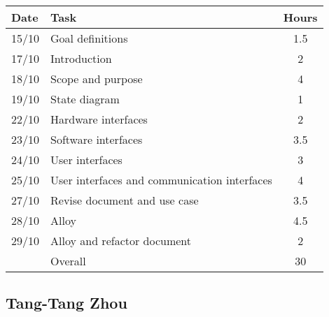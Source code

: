 \begin{table}[H]
\begin{tabularx}{\textwidth}{|l|X|c|}
\hline
\rowcolor[HTML]{C0C0C0} 
Date & Task & Hours\\ \hline
15/10 & Goal definitions & 1.5\\ \hline
17/10 & Introduction & 2\\ \hline
18/10 & Scope and purpose & 4\\ \hline
19/10 & State diagram & 1\\ \hline
22/10 & Hardware interfaces & 2\\ \hline 
23/10 & Software interfaces & 3.5\\ \hline
24/10 & User interfaces & 3\\ \hline
25/10 & User interfaces and communication interfaces & 4\\ \hline 
27/10 & Revise document and use case & 3.5\\ \hline
28/10 & Alloy & 4.5\\ \hline
29/10 & Alloy and refactor document & 2\\ \hline
\rowcolor[HTML]{C0C0C0} 
& Overall & 30\\ \hline
\end{tabularx}
\end{table}

\subsection{Tang-Tang Zhou}

